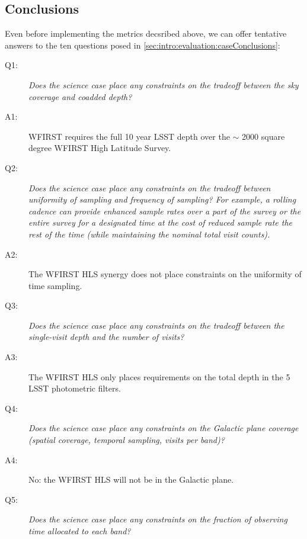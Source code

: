 
\subsection{Conclusions}
\label{sec:\secname:conclusions}

Even before implementing the metrics decsribed above, we can offer
tentative answers to the ten questions posed in
\autoref{sec:intro:evaluation:caseConclusions}:

\begin{description}

\item[Q1:] {\it Does the science case place any constraints on the
tradeoff between the sky coverage and coadded depth?}

\item[A1:] WFIRST requires the full 10 year LSST depth over the $\sim$ 2000 square degree WFIRST High Latitude Survey.

\item[Q2:] {\it Does the science case place any constraints on the
tradeoff between uniformity of sampling and frequency of  sampling? For
example, a rolling cadence can provide enhanced sample rates over a part
of the survey or the entire survey for a designated time at the cost of
reduced sample rate the rest of the time (while maintaining the nominal
total visit counts).}

\item[A2:] The WFIRST HLS synergy does not place constraints on the uniformity of time sampling.

\item[Q3:] {\it Does the science case place any constraints on the
tradeoff between the single-visit depth and the number of visits?}

\item[A3:] The WFIRST HLS only places requirements on the total depth in
the 5 LSST photometric filters.

\item[Q4:] {\it Does the science case place any constraints on the
Galactic plane coverage (spatial coverage, temporal sampling, visits per
band)?}

\item[A4:] No: the WFIRST HLS will not be in the Galactic plane.

\item[Q5:] {\it Does the science case place any constraints on the
fraction of observing time allocated to each band?}


\end{description}
